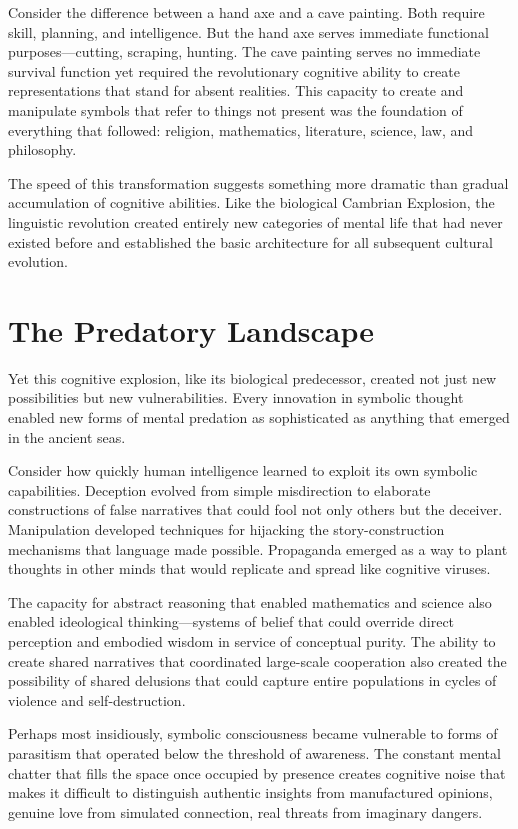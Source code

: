 Consider the difference between a hand axe and a cave painting. Both require skill, planning, and intelligence. But the hand axe serves immediate functional purposes—cutting, scraping, hunting. The cave painting serves no immediate survival function yet required the revolutionary cognitive ability to create representations that stand for absent realities. This capacity to create and manipulate symbols that refer to things not present was the foundation of everything that followed: religion, mathematics, literature, science, law, and philosophy.

The speed of this transformation suggests something more dramatic than gradual accumulation of cognitive abilities. Like the biological Cambrian Explosion, the linguistic revolution created entirely new categories of mental life that had never existed before and established the basic architecture for all subsequent cultural evolution.

\section{The Predatory Landscape}

Yet this cognitive explosion, like its biological predecessor, created not just new possibilities but new vulnerabilities. Every innovation in symbolic thought enabled new forms of mental predation as sophisticated as anything that emerged in the ancient seas.

Consider how quickly human intelligence learned to exploit its own symbolic capabilities. Deception evolved from simple misdirection to elaborate constructions of false narratives that could fool not only others but the deceiver. Manipulation developed techniques for hijacking the story-construction mechanisms that language made possible. Propaganda emerged as a way to plant thoughts in other minds that would replicate and spread like cognitive viruses.

The capacity for abstract reasoning that enabled mathematics and science also enabled ideological thinking—systems of belief that could override direct perception and embodied wisdom in service of conceptual purity. The ability to create shared narratives that coordinated large-scale cooperation also created the possibility of shared delusions that could capture entire populations in cycles of violence and self-destruction.

Perhaps most insidiously, symbolic consciousness became vulnerable to forms of parasitism that operated below the threshold of awareness. The constant mental chatter that fills the space once occupied by presence creates cognitive noise that makes it difficult to distinguish authentic insights from manufactured opinions, genuine love from simulated connection, real threats from imaginary dangers.

